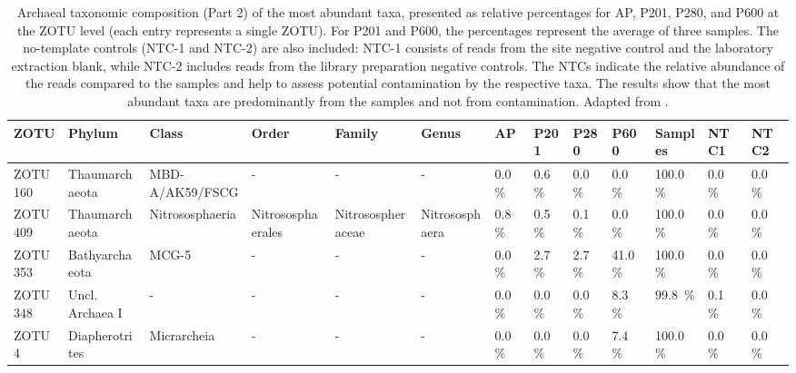 \begin{table}  %
\centering
\begin{adjustbox}{max width=0.8\textwidth, max totalheight=0.85\textheight, keepaspectratio}
\renewcommand{\arraystretch}{1.5} %
\footnotesize %
\caption{Archaeal taxonomic composition (Part 2) of the most abundant taxa, presented as relative percentages for AP, P201, P280, and P600 at the ZOTU level (each entry represents a single ZOTU).
For P201 and P600, the percentages represent the average of three samples.
The no-template controls (NTC-1 and NTC-2) are also included: NTC-1 consists of reads from the site negative control and the laboratory extraction blank, while NTC-2 includes reads from the library preparation negative controls.
The NTCs indicate the relative abundance of the reads compared to the samples and help to assess potential contamination by the respective taxa.
The results show that the most abundant taxa are predominantly from the samples and not from contamination.
Adapted from \cite{giroud2025microbio}.}
\label{tabSI:tax_arc_2}
\begin{tabular}{llllllllll||lll}
\toprule
\textbf{ZOTU} & \textbf{Phylum} & \textbf{Class} & \textbf{Order} & \textbf{Family} & \textbf{Genus} & \textbf{AP} & \textbf{P201} & \textbf{P280} & \textbf{P600} & \textbf{Samples} & \textbf{NTC1} & \textbf{NTC2} \\
\midrule
ZOTU160 & Thaumarchaeota & MBD-A/AK59/FSCG & - & - & - & \SI{0.0}{\percent} & \SI{0.6}{\percent} & \SI{0.0}{\percent} & \SI{0.0}{\percent} & \SI{100.0}{\percent} & \SI{0.0}{\percent} & \SI{0.0}{\percent} \\
ZOTU409 & Thaumarchaeota & Nitrososphaeria & Nitrososphaerales & Nitrosospheraceae & Nitrososphaera & \SI{0.8}{\percent} & \SI{0.5}{\percent} & \SI{0.1}{\percent} & \SI{0.0}{\percent} & \SI{100.0}{\percent} & \SI{0.0}{\percent} & \SI{0.0}{\percent} \\
ZOTU353 & Bathyarchaeota & MCG-5 & - & - & - & \SI{0.0}{\percent} & \SI{2.7}{\percent} & \SI{2.7}{\percent} & \SI{41.0}{\percent} & \SI{100.0}{\percent} & \SI{0.0}{\percent} & \SI{0.0}{\percent} \\
ZOTU348 & Uncl. Archaea I & - & - & - & - & \SI{0.0}{\percent} & \SI{0.0}{\percent} & \SI{0.0}{\percent} & \SI{8.3}{\percent} & \SI{99.8}{\percent} & \SI{0.1}{\percent} & \SI{0.0}{\percent} \\
ZOTU4 & Diapherotrites & Micrarcheia & - & - & - & \SI{0.0}{\percent} & \SI{0.0}{\percent} & \SI{0.0}{\percent} & \SI{7.4}{\percent} & \SI{100.0}{\percent} & \SI{0.0}{\percent} & \SI{0.0}{\percent} \\

\end{tabular}
\end{adjustbox}
\end{table}

